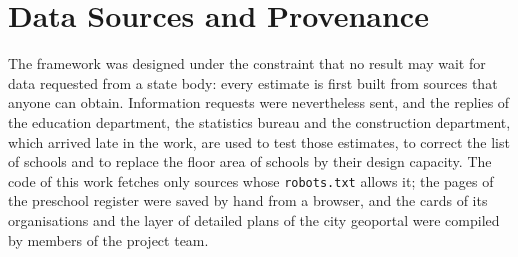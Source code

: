 \section{Data Sources and Provenance}
\label{sec:sources}

The framework was designed under the constraint that no result may wait for data requested from a state body: every estimate is first built from sources that anyone can obtain. Information requests were nevertheless sent, and the replies of the education department, the statistics bureau and the construction department, which arrived late in the work, are used to test those estimates, to correct the list of schools and to replace the floor area of schools by their design capacity. The code of this work fetches only sources whose \texttt{robots.txt} allows it; the pages of the preschool register were saved by hand from a browser, and the cards of its organisations and the layer of detailed plans of the city geoportal were compiled by members of the project team.

